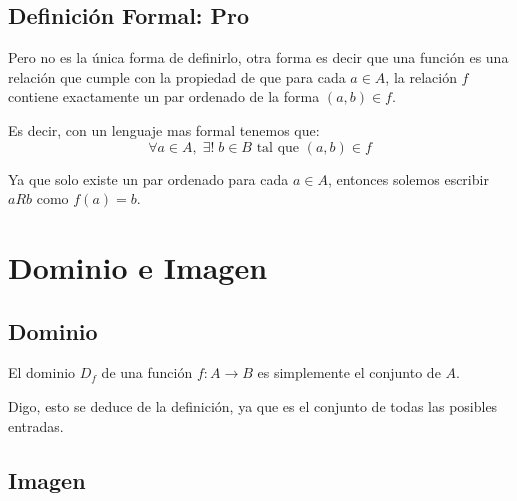 \documentclass[12pt, fleqn]{report}                             %
\begin{document}
            \subsection*{Definición Formal: Pro}

                Pero no es la única forma de definirlo, otra forma es decir que una función es
                una relación que cumple con la propiedad de que para cada $a \in A$, la relación
                $f$ contiene exactamente un par ordenado de la forma $(a,b) \in f$.

                Es decir, con un lenguaje mas formal tenemos que:
                \begin{equation*}
                    \forall a \in A, \; \exists ! \; b \in B \text{ tal que } (a,b) \in f
                \end{equation*}

                Ya que solo existe un par ordenado para cada $a \in A$, entonces solemos escribir 
                $aRb$ como $f(a) = b$.








        \clearpage
        \section{Dominio e Imagen}
            
            \subsection*{Dominio}

                El dominio $D_f$ de una función $f : A \to B$ es simplemente el conjunto de $A$.

                Digo, esto se deduce de la definición, ya que es el conjunto de todas las posibles
                entradas.

            \subsection*{Imagen}
\end{document}
